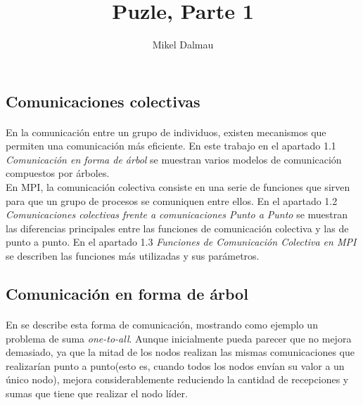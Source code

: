 \documentclass[es,gi]{ifirak}
\begin{document}
\title{Puzle, Parte 1}
\author{Mikel Dalmau}

\maketitle

\setlength{\columnsep}{1cm}
\begin{multicols}{2}
\section{Comunicaciones colectivas}
\paragraph{}	
En la comunicación entre un grupo de individuos, existen mecanismos que permiten una comunicación más eficiente. En este trabajo en el apartado 1.1 \textit{Comunicación en forma de árbol} se muestran varios modelos de comunicación compuestos por árboles.\\

En MPI, la comunicación colectiva consiste en una serie de funciones que sirven para que un grupo de procesos se comuniquen entre ellos. En el apartado 1.2 \textit{Comunicaciones colectivas frente a comunicaciones Punto a Punto} se muestran las diferencias principales entre las funciones de comunicación colectiva y las de punto a punto. En el apartado 1.3 \emph{Funciones de Comunicación Colectiva en MPI} se describen las funciones más utilizadas y sus parámetros.\\
\subsection{Comunicación en forma de árbol}
\paragraph{}
En \cite{key-1} se describe esta forma de comunicación, mostrando como ejemplo un problema de suma \textit{one-to-all}. Aunque inicialmente pueda parecer que no mejora demasiado, ya que la mitad de los nodos realizan las mismas comunicaciones que realizarían punto a punto(esto es, cuando todos los nodos envían su valor a un único nodo), mejora considerablemente reduciendo la cantidad de recepciones y sumas que tiene que realizar el nodo líder. 

\end{multicols}
\end{document}
